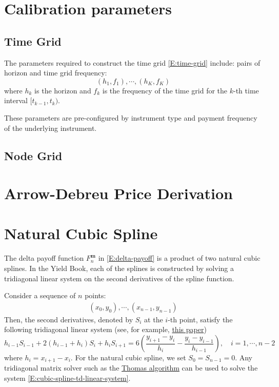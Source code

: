 \documentclass{texyise}
\begin{document}
\section{Calibration parameters}

\subsection{Time Grid}
\label{S:time-grid}

The parameters required to construct the time grid \eqref{E:time-grid} include:
pairs of horizon and time grid frequency:
\begin{equation}
    (h_1, f_1), \cdots, (h_K, f_K)
\end{equation}
where $h_k$ is the horizon and $f_k$ is the frequency of the time grid for the $k$-th time interval $[t_{k-1}, t_k)$.

These parameters are pre-configured by instrument type and payment frequency of the underlying instrument. 


\subsection{Node Grid}
\label{S:node-grid}

\appendix

\section{Arrow-Debreu Price Derivation}
\label{S:arrow-debreu}

\section{Natural Cubic Spline}
\label{S:cubic-spline}

The delta payoff function $F_n^{\bm{m}}$ in \eqref{E:delta-payoff} is a product of two natural cubic splines. In the Yield Book, each of the splines is constructed by solving a tridiagonal linear system on the second derivatives of the spline function. 

Consider a sequence of $n$ points:
\begin{eqnarray}
    (x_0, y_0), \cdots, (x_{n-1}, y_{n-1}) 
\end{eqnarray}
Then, the second derivatives, denoted by $S_i$ at the $i$-th point, satisfy the following tridiagonal linear system (see, for example, 
\href{https://charles-oneill.com/projects/cubicspline.pdf}{this paper})
\begin{equation}
    h_{i-1}S_{i-1} + 2(h_{i-1} + h_i)S_i + h_iS_{i+1} = 6\left(\frac{y_{i+1} - y_i}{h_i} - \frac{y_i - y_{i-1}}{h_{i-1}}\right), \quad i = 1, \cdots, n-2
    \label{E:cubic-spline-td-linear-system}
\end{equation}
where $h_i = x_{i+1} - x_{i}$. For the natural cubic spline, we set $S_0 = S_{n-1} = 0$.
Any tridiagonal matrix solver such as the \href{https://en.wikipedia.org/wiki/Tridiagonal_matrix_algorithm}{Thomas algorithm} can be used to solve the system \eqref{E:cubic-spline-td-linear-system}.
\end{document}
